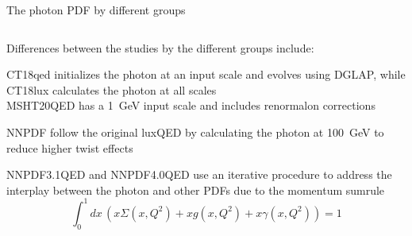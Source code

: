 \documentclass[aspectratio=169, 8pt,t]{beamer}
\begin{document}
\begin{frame}{The photon PDF by different groups}
  \begin{columns}[T]
    \begin{column}{0.59\textwidth}


      Differences between the studies by the different groups include:

      \vspace*{1em}
      CT18qed initializes the photon at an input scale and evolves using DGLAP, while CT18lux calculates the photon at all scales\\


      \vspace*{1em}
      MSHT20QED has a 1~GeV input scale and includes renormalon corrections

      \vspace*{1em}
      NNPDF follow the original luxQED by calculating the photon at 100~GeV to reduce higher twist effects

      \vspace*{0.5em}
      NNPDF3.1QED and NNPDF4.0QED use an iterative procedure to address the interplay between the photon and other PDFs due to the momentum sumrule
      \begin{equation*}
        \int_0^1 dx\, \left(  x\Sigma(x,Q^2) + xg(x,Q^2) + x\gamma(x,Q^2) \right) =1
      \end{equation*}
    \end{column}


\end{columns}
\end{frame}
\end{document}
